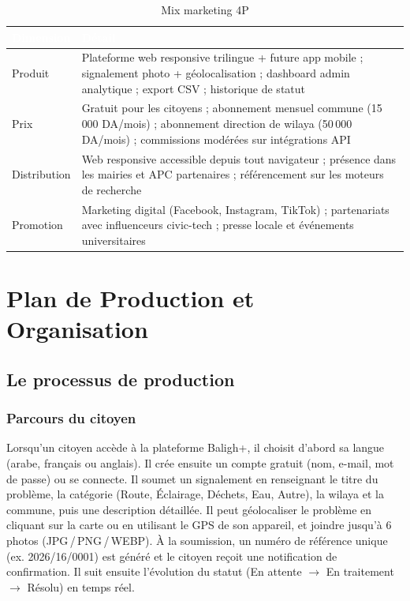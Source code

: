 \documentclass[12pt,a4paper]{report}
\newcommand{\thdcell}[1]{%
  \cellcolor{tabhead}\textbf{\textcolor{white}{#1}}%
}
\begin{document}
\begin{table}[H]
  \centering
  \caption{Mix marketing 4P}
  \renewcommand{\arraystretch}{1.4}
  \begin{tabularx}{\linewidth}{lX}
    \toprule
    \rowcolor{primary}
    \thdcell{Dimension} & \thdcell{Détail} \\
    \midrule

    Produit &
    Plateforme web responsive trilingue + future app mobile ; signalement
    photo + géolocalisation ; dashboard admin analytique ; export CSV ;
    historique de statut \\

    \rowcolor{lightgray}
    Prix &
    Gratuit pour les citoyens ; abonnement mensuel commune (15\,000
    DA/mois) ; abonnement direction de wilaya (50\,000 DA/mois) ;
    commissions modérées sur intégrations API \\

    Distribution &
    Web responsive accessible depuis tout navigateur ; présence dans les
    mairies et APC partenaires ; référencement sur les moteurs de recherche \\

    \rowcolor{lightgray}
    Promotion &
    Marketing digital (Facebook, Instagram, TikTok) ; partenariats avec
    influenceurs civic-tech ; presse locale et événements universitaires \\

    \bottomrule
  \end{tabularx}
\end{table}

\chapter{Plan de Production et Organisation}

\section{Le processus de production}

\subsection{Parcours du citoyen}

Lorsqu'un citoyen accède à la plateforme Baligh+, il choisit d'abord sa langue
(arabe, français ou anglais). Il crée ensuite un compte gratuit (nom, e-mail,
mot de passe) ou se connecte. Il soumet un signalement en renseignant le titre
du problème, la catégorie (Route, Éclairage, Déchets, Eau, Autre), la wilaya et
la commune, puis une description détaillée. Il peut géolocaliser le problème en
cliquant sur la carte ou en utilisant le GPS de son appareil, et joindre
jusqu'à 6 photos (JPG\,/\,PNG\,/\,WEBP). À la soumission, un numéro de
référence unique (ex. 2026/16/0001) est généré et le citoyen reçoit une
notification de confirmation. Il suit ensuite l'évolution du statut
(En attente $\rightarrow$ En traitement $\rightarrow$ Résolu) en temps réel.
\end{document}
